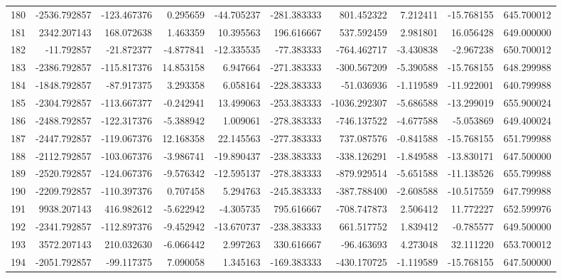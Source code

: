 \begin{tabular}{lrrrrrrrrr}
180 &  -2536.792857 &  -123.467376 &   0.295659 & -44.705237 &  -281.383333 &   801.452322 &   7.212411 & -15.768155 &  645.700012 \\
181 &   2342.207143 &   168.072638 &   1.463359 &  10.395563 &   196.616667 &   537.592459 &   2.981801 &  16.056428 &  649.000000 \\
182 &    -11.792857 &   -21.872377 &  -4.877841 & -12.335535 &   -77.383333 &  -764.462717 &  -3.430838 &  -2.967238 &  650.700012 \\
183 &  -2386.792857 &  -115.817376 &  14.853158 &   6.947664 &  -271.383333 &  -300.567209 &  -5.390588 & -15.768155 &  648.299988 \\
184 &  -1848.792857 &   -87.917375 &   3.293358 &   6.058164 &  -228.383333 &   -51.036936 &  -1.119589 & -11.922001 &  640.799988 \\
185 &  -2304.792857 &  -113.667377 &  -0.242941 &  13.499063 &  -253.383333 & -1036.292307 &  -5.686588 & -13.299019 &  655.900024 \\
186 &  -2488.792857 &  -122.317376 &  -5.388942 &   1.009061 &  -278.383333 &  -746.137522 &  -4.677588 &  -5.053869 &  649.400024 \\
187 &  -2447.792857 &  -119.067376 &  12.168358 &  22.145563 &  -277.383333 &   737.087576 &  -0.841588 & -15.768155 &  651.799988 \\
188 &  -2112.792857 &  -103.067376 &  -3.986741 & -19.890437 &  -238.383333 &  -338.126291 &  -1.849588 & -13.830171 &  647.500000 \\
189 &  -2520.792857 &  -124.067376 &  -9.576342 & -12.595137 &  -278.383333 &  -879.929514 &  -5.651588 & -11.138526 &  655.799988 \\
190 &  -2209.792857 &  -110.397376 &   0.707458 &   5.294763 &  -245.383333 &  -387.788400 &  -2.608588 & -10.517559 &  647.799988 \\
191 &   9938.207143 &   416.982612 &  -5.622942 &  -4.305735 &   795.616667 &  -708.747873 &   2.506412 &  11.772227 &  652.599976 \\
192 &  -2341.792857 &  -112.897376 &  -9.452942 & -13.670737 &  -238.383333 &   661.517752 &   1.839412 &  -0.785577 &  649.500000 \\
193 &   3572.207143 &   210.032630 &  -6.066442 &   2.997263 &   330.616667 &   -96.463693 &   4.273048 &  32.111220 &  653.700012 \\
194 &  -2051.792857 &   -99.117375 &   7.090058 &   1.345163 &  -169.383333 &  -430.170725 &  -1.119589 & -15.768155 &  647.500000 \\

\end{tabular}
